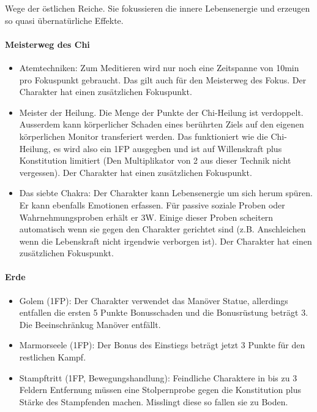 \documentclass{article}
\begin{document}
Wege der östlichen Reiche. Sie fokussieren die innere Lebensenergie und erzeugen so quasi übernatürliche Effekte.

\paragraph{Meisterweg des Chi}

\begin{itemize}
\item Atemtechniken: Zum Meditieren wird nur noch eine Zeitspanne von 10min pro Fokuspunkt gebraucht. Das gilt auch für den Meisterweg des Fokus. Der Charakter hat einen zusätzlichen Fokuspunkt.
\item Meister der Heilung. Die Menge der Punkte der Chi-Heilung ist verdoppelt. Ausserdem kann körperlicher Schaden eines berührten Ziels auf den eigenen körperlichen Monitor transferiert werden. Das funktioniert wie die Chi-Heilung, es wird also ein 1FP ausgegben und ist auf Willenskraft plus Konstitution limitiert (Den Multiplikator von 2 aus dieser Technik nicht vergessen). Der Charakter hat einen zusätzlichen Fokuspunkt.
\item Das siebte Chakra: Der Charakter kann Lebensenergie um sich herum spüren. Er kann ebenfalls Emotionen erfassen. Für passive soziale Proben oder Wahrnehmungsproben erhält er 3W. Einige dieser Proben scheitern automatisch wenn sie gegen den Charakter gerichtet sind (z.B. Anschleichen wenn die Lebenskraft nicht irgendwie verborgen ist). Der Charakter hat einen zusätzlichen Fokuspunkt.
\end{itemize}

\paragraph{Erde}

\begin{itemize}
\item Golem (1FP): Der Charakter verwendet das Manöver Statue, allerdings entfallen die ersten 5 Punkte Bonusschaden und die Bonusrüstung beträgt 3. Die Beeinschränkug Manöver entfällt.
\item Marmorseele (1FP): Der Bonus des Einstiegs beträgt jetzt 3 Punkte für den restlichen Kampf.
\item Stampftritt (1FP, Bewegungshandlung): Feindliche Charaktere in bis zu 3 Feldern Entfernung müssen eine Stolpernprobe gegen die Konstitution plus Stärke des Stampfenden machen. Misslingt diese so fallen sie zu Boden.
\end{itemize}
\end{document}
